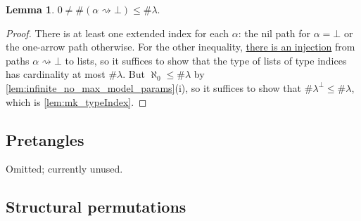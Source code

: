\documentclass{article}
\newcommand{\mlem}[3]{\href{https://leanprover-community.github.io/mathlib4\_docs/Mathlib/#1.html\##2}{#3}}
\theoremstyle{definition}
\newtheorem{lemma}[theorem]{Lemma}
\theoremstyle{remark}
\begin{document}
\begin{lemma}
    \label{lem:mk_extendedIndex}
    \( 0 \neq \#(\alpha \rightsquigarrow \bot) \leq \#\lambda \).
\end{lemma}
\begin{proof}
    There is at least one extended index for each \( \alpha \): the nil path for \( \alpha = \bot \) or the one-arrow path otherwise.
    For the other inequality, \mlem{Combinatorics/Quiver/Path}{Quiver.Path.toList}{there is an injection} from paths \( \alpha \rightsquigarrow \bot \) to lists, so it suffices to show that the type of lists of type indices has cardinality at most \( \#\lambda \).
    But \( \aleph_0 \leq \#\lambda \) by \ref{lem:infinite_no_max_model_params}(i), so it suffices to show that \( \#\lambda^\bot \leq \#\lambda \), which is \ref{lem:mk_typeIndex}.
\end{proof}

\subsection{Pretangles}

Omitted; currently unused.

\subsection{Structural permutations}
\end{document}
